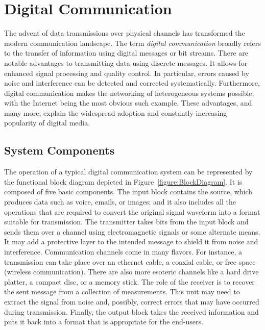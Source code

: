 
\chapter{Digital Communication}
\label{chapter:DigitalComm}

The advent of data transmissions over physical channels has transformed the modern communication landscape.
The term \emph{digital communication} broadly refers to the transfer of information using digital messages or bit streams.
There are notable advantages to transmitting data  using discrete messages.
It allows for enhanced signal processing and quality control.
In particular, errors caused by noise and interference can be detected and corrected systematically.
Furthermore, digital communication makes the networking of heterogeneous systems possible, with the Internet being the most obvious such example.
These advantages, and many more, explain the widespread adoption and constantly increasing popularity of digital media.


\section{System Components}

The operation of a typical digital communication system can be represented by the functional block diagram depicted in Figure~\ref{figure:BlockDiagram}.
It is composed of five basic components.
The input block contains the source, which produces data such as voice, emails, or images; and it also includes all the operations that are required to convert the original signal waveform into a format suitable for transmission.
The transmitter takes bits from the input block and sends them over a channel using electromagnetic signals or some alternate means.
It may add a protective layer to the intended message to shield it from noise and interference.
Communication channels come in many flavors.
For instance, a transmission can take place over an ethernet cable, a coaxial cable, or free space (wireless communication).
There are also more esoteric channels like a hard drive platter, a compact disc, or a memory stick.
The role of the receiver is to recover the sent message from a collection of measurements.
This unit may need to extract the signal from noise and, possibly, correct errors that may have occurred during transmission.
Finally, the output block takes the received information and puts it back into a format that is appropriate for the end-users.

